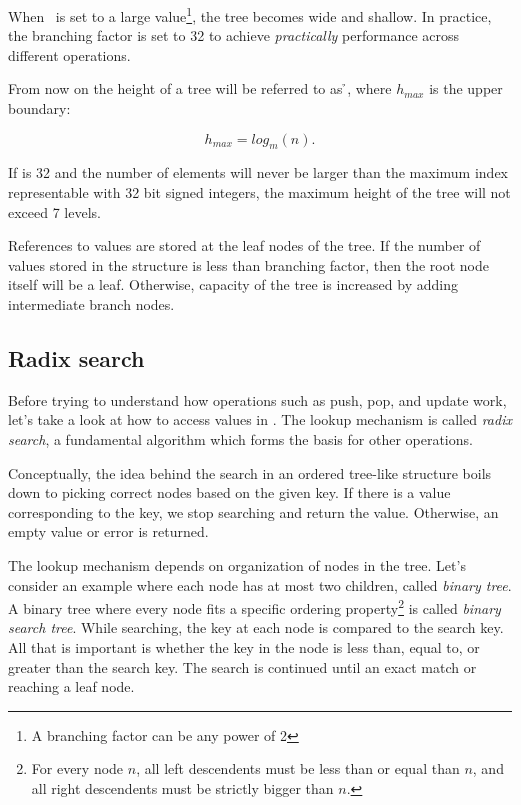 When \m\ is set to a large value\footnote{A branching factor can be any power of 2}, the tree becomes wide and shallow. In practice, the branching factor is set to 32 to achieve \emph{practically}  performance across different operations.

From now on the height of a tree will be referred to as \h{}, where $h_{max}$ is the upper boundary:

\begin{equation}
    h_{max} = log_m(n).
\end{equation}

If \m{} is 32 and the number of elements will never be larger than the maximum index representable with 32 bit signed integers, the maximum height of the tree will not exceed 7 levels.

References to values are stored at the leaf nodes of the tree. If the number of values stored in the structure is less than branching factor, then the root node itself will be a leaf. Otherwise, capacity of the tree is increased by adding intermediate branch nodes.

\subsection{Radix search}
\label{sec:rb-tree-radix-search}

Before trying to understand how operations such as push, pop, and update work, let's take a look at how to access values in \rbtree{}. The lookup mechanism is called \emph{radix search}, a fundamental algorithm which forms the basis for other operations.

Conceptually, the idea behind the search in an ordered tree-like structure boils down to picking correct nodes based on the given key. If there is a value corresponding to the key, we stop searching and return the value. Otherwise, an empty value or error is returned.

The lookup mechanism depends on organization of nodes in the tree. Let's consider an example where each node has at most two children, called \emph{binary tree}. A binary tree where every node fits a specific ordering property\footnote{For every node $n$, all left descendents must be less than or equal than $n$, and all right descendents must be strictly bigger than $n$.} is called \emph{binary search tree}. While searching, the key at each node is compared to the search key. All that is important is whether the key in the node is less than, equal to, or greater than the search key. The search is continued until an exact match or reaching a leaf node.

